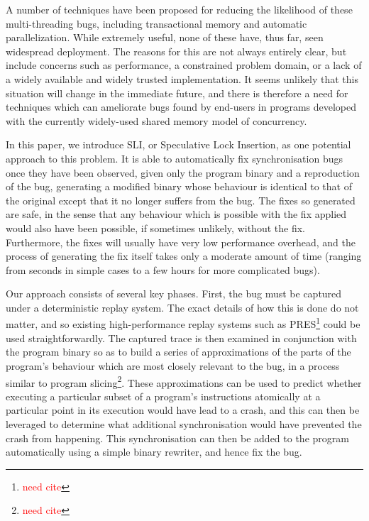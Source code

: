 \documentclass[10pt,twocolumn,preprint,natbib,authoryear]{sigplanconf}
\newcommand{\editorial}[1]{\textcolor{red}{\footnote{\textcolor{red}{#1}}}}
\newcommand{\needCite}{\editorial{need cite}}
\begin{document}
A number of techniques have been proposed for reducing the likelihood
of these multi-threading bugs, including transactional
memory\cite{Shavit1997} and automatic parallelization\cite{Bacon1994}.
While extremely useful, none of these have, thus far, seen widespread
deployment.  The reasons for this are not always entirely clear, but
include concerns such as performance, a constrained problem domain, or
a lack of a widely available and widely trusted implementation.  It
seems unlikely that this situation will change in the immediate
future, and there is therefore a need for techniques which can
ameliorate bugs found by end-users in programs developed with the
currently widely-used shared memory model of concurrency.

In this paper, we introduce SLI, or Speculative Lock Insertion, as one
potential approach to this problem.  It is able to automatically fix
synchronisation bugs once they have been observed, given only the
program binary and a reproduction of the bug, generating a modified
binary whose behaviour is identical to that of the original except
that it no longer suffers from the bug.  The fixes so generated are
safe, in the sense that any behaviour which is possible with the fix
applied would also have been possible, if sometimes unlikely, without
the fix.  Furthermore, the fixes will usually have very low
performance overhead, and the process of generating the fix itself
takes only a moderate amount of time (ranging from seconds in simple
cases to a few hours for more complicated bugs).

Our approach consists of several key phases.  First, the bug must be
captured under a deterministic replay system.  The exact details of
how this is done do not matter, and so existing high-performance
replay systems such as PRES\needCite{} could be used
straightforwardly.  The captured trace is then examined in conjunction
with the program binary so as to build a series of approximations of
the parts of the program's behaviour which are most closely relevant
to the bug, in a process similar to program slicing\needCite{}.  These
approximations can be used to predict whether executing a particular
subset of a program's instructions atomically at a particular point in
its execution would have lead to a crash, and this can then be
leveraged to determine what additional synchronisation would have
prevented the crash from happening.  This synchronisation can then be
added to the program automatically using a simple binary rewriter, and
hence fix the bug.
\end{document}
